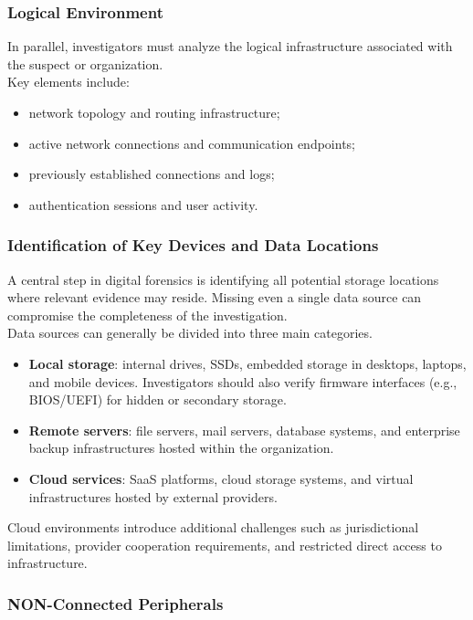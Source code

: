\subsubsection*{Logical Environment}

In parallel, investigators must analyze the logical infrastructure associated with the suspect or organization.
\\
Key elements include:

\begin{itemize}
\item network topology and routing infrastructure;
\item active network connections and communication endpoints;
\item previously established connections and logs;
\item authentication sessions and user activity.
\end{itemize}

\subsubsection{Identification of Key Devices and Data Locations}

A central step in digital forensics is identifying all potential storage locations where relevant evidence may reside. Missing even a single data source can compromise the completeness of the investigation.
\\
Data sources can generally be divided into three main categories.

\begin{itemize}
\item \textbf{Local storage}: internal drives, SSDs, embedded storage in desktops, laptops, and mobile devices. Investigators should also verify firmware interfaces (e.g., BIOS/UEFI) for hidden or secondary storage.
\item \textbf{Remote servers}: file servers, mail servers, database systems, and enterprise backup infrastructures hosted within the organization.
\item \textbf{Cloud services}: SaaS platforms, cloud storage systems, and virtual infrastructures hosted by external providers.
\end{itemize}

\noindent
Cloud environments introduce additional challenges such as jurisdictional limitations, provider cooperation requirements, and restricted direct access to infrastructure.

\subsubsection* {NON-Connected Peripherals}

